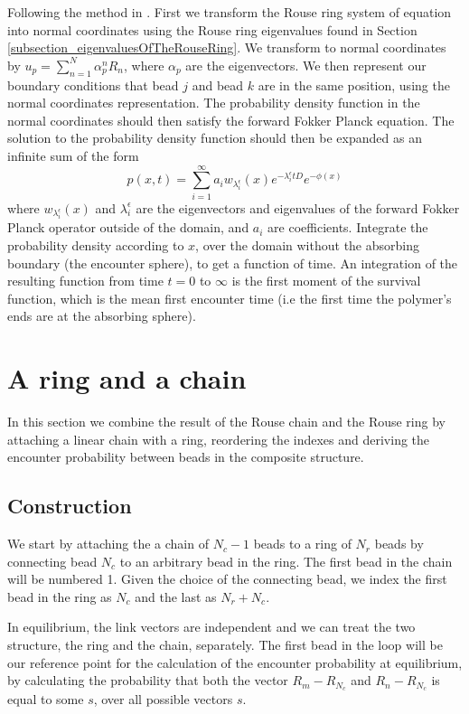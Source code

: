 \documentclass{report}
\begin{document}
Following the method in \cite{amitai2012computation}. First we transform the Rouse ring system of equation into normal coordinates using the Rouse ring eigenvalues found in Section \ref{subsection_eigenvaluesOfTheRouseRing}. We transform to normal coordinates by $u_p=\sum_{n=1}^N \alpha_p^nR_n$, where $\alpha_p$ are the eigenvectors. We then represent our boundary conditions that bead $j$ and bead $k$ are in the same position, using the normal coordinates representation. The probability density function in the normal coordinates should then satisfy the forward Fokker Planck equation. The solution to the probability density function should then be expanded as an infinite sum of the form 
\begin{equation*}
p(x,t)=\sum_{i=1}^\infty a_iw_{\lambda_i^\epsilon}(x)e^{-\lambda_i^\epsilon tD}e^{-\phi(x)}
\end{equation*}
where $w_{\lambda_i^\epsilon}(x)$ and $\lambda_i^\epsilon$ are the eigenvectors and eigenvalues of the forward Fokker Planck operator outside of the domain, and $a_i$ are coefficients. Integrate the probability density according to $x$, over the domain without the absorbing boundary (the encounter sphere), to get a function of time. An integration of the resulting function from time $t=0$ to $\infty$ is the first moment of the survival function, which is the mean first encounter time (i.e the first time the polymer's ends are at the absorbing sphere). 

\section{A ring and a chain}\label{section_aRingAndAChain}
In this section we combine the result of the Rouse chain and the Rouse ring by attaching a linear chain with a ring, reordering the indexes and deriving the encounter probability between beads in the composite structure. 

\subsection{Construction}\label{subsection_construction}
We start by attaching the a chain of $N_c-1$ beads to a ring of $N_r$ beads by connecting bead $N_c$ to an arbitrary bead in the ring. The first bead in the chain will be numbered 1. Given the choice of the connecting bead, we index the first bead in the ring as $N_c$ and the last as $N_r+N_c$. 

In equilibrium, the link vectors are independent and we can treat the two structure, the ring and the chain, separately. The first bead in the loop will be our reference point for the calculation of the encounter probability at equilibrium, by calculating the probability that both the vector $R_m-R_{N_c}$ and $R_n-R_{N_c}$ is equal to some $s$, over all possible vectors $s$.
\end{document}
